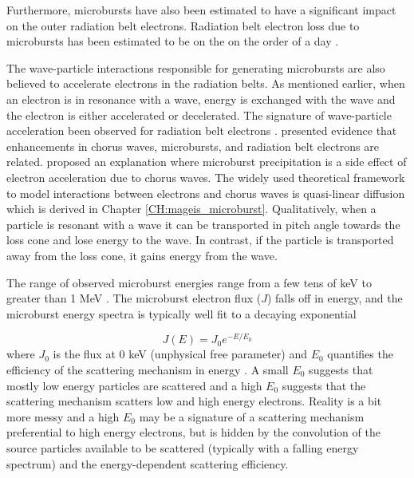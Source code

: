 Furthermore, microbursts have also been estimated to have a significant impact on the outer radiation belt electrons. Radiation belt electron loss due to microbursts has been estimated to be on the on the order of a day \citep{Lorentzen2001b, O'Brien2004, Thorne2005, Breneman2017, Douma2019}. 

The wave-particle interactions responsible for generating microbursts are also believed to accelerate electrons in the radiation belts. As mentioned earlier, when an electron is in resonance with a wave, energy is exchanged with the wave and the electron is either accelerated or decelerated. The signature of wave-particle acceleration been observed for radiation belt electrons \citep[e.g.][]{Meredith2002, Horne2005, Reeves2013}. \citet{O'Brien2003} presented evidence that enhancements in chorus waves, microbursts, and radiation belt electrons are related. \citet{O'Brien2003} proposed an explanation where microburst precipitation is a side effect of electron acceleration due to chorus waves. The widely used theoretical framework to model interactions between electrons and chorus waves is quasi-linear diffusion \citep[e.g.][]{Walker1993, Summers1998, Meredith2002, Horne2005, Thorne2005, Summers2005} which is derived in Chapter \ref{CH:mageis_microburst}. Qualitatively, when a particle is resonant with a wave it can be transported in pitch angle towards the loss cone and lose energy to the wave. In contrast, if the particle is transported away from the loss cone, it gains energy from the wave.

The range of observed microburst energies range from a few tens of keV \citep[e.g][]{Datta1997, Parks1967} to greater than 1 MeV \citep[e.g.][]{Blake1996, Greeley2019}. The microburst electron flux ($J$) falls off in energy, and the microburst energy spectra is typically well fit to a decaying exponential 

\begin{equation}
J(E) = J_0 e^{-E/E_0}
\end{equation} where $J_0$ is the flux at 0 keV (unphysical free parameter) and $E_0$ quantifies the efficiency of the scattering mechanism in energy \citep[.e.g][]{Parks1967, Datta1997, Lee2005}. A small $E_0$ suggests that mostly low energy particles are scattered and a high $E_0$ suggests that the scattering mechanism scatters low and high energy electrons. Reality is a bit more messy and a high $E_0$ may be a signature of a scattering mechanism preferential to high energy electrons, but is hidden by the convolution of the source particles available to be scattered (typically with a falling energy spectrum) and the energy-dependent scattering efficiency.

